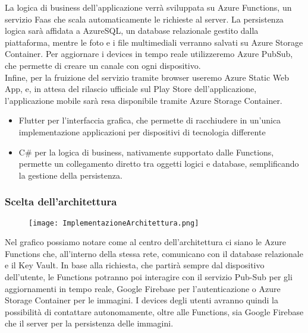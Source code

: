 La logica di business dell'applicazione verrà sviluppata su Azure Functions, un servizio Faas che scala automaticamente le richieste al server.
La persistenza logica sarà affidata a AzureSQL, un database relazionale gestito dalla piattaforma, mentre le foto e i file multimediali verranno salvati su Azure Storage Container.
Per aggiornare i devices in tempo reale utilizzeremo Azure PubSub, che permette di creare un canale con ogni dispositivo.\\
Infine, per la fruizione del servizio tramite browser useremo Azure Static Web App, e, in attesa del rilascio ufficiale sul Play Store dell'applicazione, 
l'applicazione mobile sarà resa disponibile tramite Azure Storage Container.\\
\begin{itemize}
    \item Flutter per l'interfaccia grafica, che permette di racchiudere in un'unica implementazione applicazioni per dispositivi di tecnologia differente
    \item C\# per la logica di business, nativamente supportato dalle Functions, permette un collegamento diretto tra oggetti logici e database, semplificando la gestione della persistenza.
\end{itemize}
\pagebreak

\subsubsection{Scelta dell'architettura}
\begin{figure}[h!]
    \begin{center}
        \texttt{[image: ImplementazioneArchitettura.png]}
    \end{center}
\end{figure}
Nel grafico possiamo notare come al centro dell'architettura ci siano le Azure Functions che, all'interno della stessa rete, comunicano con il database relazionale e il Key Vault.
In base alla richiesta, che partirà sempre dal dispositivo dell'utente, le Functions potranno poi interagire con 
il servizio Pub-Sub per gli aggiornamenti in tempo reale, 
Google Firebase per l'autenticazione o 
Azure Storage Container per le immagini.
I devices degli utenti avranno quindi la possibilità di contattare autonomamente, oltre alle Functions, sia Google Firebase che il server per la persistenza delle immagini. 
\clearpage
